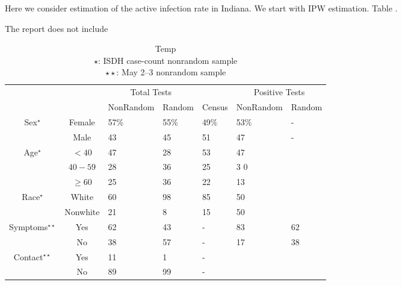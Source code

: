 \documentclass[11pt]{amsart}
\begin{document}
Here we consider estimation of the active infection rate in Indiana.  We start with IPW estimation.  Table .

The report does not include

\begin{table}[!th]
\begin{tabular}{c | c | l l | l | l l }
& & \multicolumn{2}{c}{Total Tests} &  & \multicolumn{2}{c}{Positive Tests} \\
\cline{3-4} \cline{6-7}
& & NonRandom & Random & Census & NonRandom & Random \\ \hline
\multirow{2}{*}{Sex$^\star$} & Female & 57\% & 55\% & 49\% & 53\% & - \\
& Male & 43 & 45 & 51 & 47 & -  \\ \hline
\multirow{3}{*}{Age$^\star$} & $<40$ & 47 & 28 & 53 & 47\\
& $40-59$ & 28 & 36 & 25 & 3 0\\
& $\geq 60$ & 25 & 36 & 22 & 13\\ \hline
\multirow{2}{*}{Race$^\star$} & White & 60 & 98 & 85 & 50\\
& Nonwhite & 21 & 8 & 15 & 50 \\ \hline
\multirow{2}{*}{Symptoms$^{\star \star}$} & Yes & 62 & 43 & - & 83 & 62 \\
& No & 38 & 57 & - & 17 & 38  \\ \hline
\multirow{2}{*}{Contact$^{\star \star}$} & Yes & 11 & 1 & - \\
& No & 89 & 99 & - \\ \hline
\end{tabular}
\caption{Temp \\
$\star$: ISDH case-count nonrandom sample \\
$\star\star$: May 2--3 nonrandom sample
}
\end{table}



\end{document}
